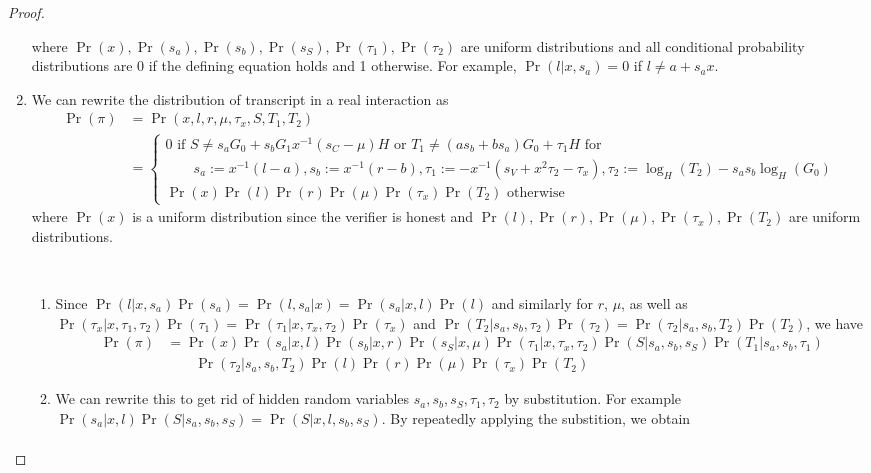 \begin{proof}
\begin{enumerate}
    where $\Pr(x),\Pr(s_a),\Pr(s_b),\Pr(s_S),\Pr(\tau_1),\Pr(\tau_2)$ are uniform distributions and all conditional probability distributions are 0 if the defining equation holds and 1 otherwise. For example, $\Pr(l|x, s_a) = 0$ if $l\ne a + s_ax$.
   \item We can rewrite the distribution of transcript in a real interaction as
    \begin{align*}
        \Pr(\pi) &= \Pr(x, l, r, \mu, \tau_x, S, T_1, T_2)\\
                        &= \begin{cases} 0 \text{ if } S \ne s_aG_0 + s_bG_1 x^{-1}(s_C - \mu)H \text{ or } T_1 \ne (as_b + bs_a)G_0 + \tau_1H \text{ for }\\ \qquad s_a := x^{-1}(l - a), s_b := x^{-1}(r - b), \tau_1 := - x^{-1}(s_V  + x^2\tau_2 - \tau_x), \tau_2 := \log_H(T_2) - s_as_b\log_H(G_0) \\
                             \Pr(x)\Pr(l)\Pr(r)\Pr(\mu)\Pr(\tau_x)\Pr(T_2) \text{ otherwise}
                             \end{cases}
    \end{align*}
    where $\Pr(x)$ is a uniform distribution since the verifier is honest and $\Pr(l),\Pr(r),\Pr(\mu),\Pr(\tau_x),\Pr(T_2)$ are uniform distributions.
   \begin{innerproof}
     $ $\par
     \begin{enumerate}
     \item Since $\Pr(l|x, s_a)\Pr(s_a) = \Pr(l,s_a|x) = \Pr(s_a|x, l) \Pr(l)$ and similarly for $r$, $\mu$, as well as $\Pr(\tau_x| x, \tau_1, \tau_2)\Pr(\tau_1 ) = \Pr(\tau_1| x, \tau_x, \tau_2)\Pr(\tau_x )$ and $\Pr(T_2| s_a, s_b, \tau_2)\Pr(\tau_2) = \Pr(\tau_2| s_a, s_b, T_2)\Pr(T_2)$,
       we have
       \begin{align*}
      \Pr(\pi) &= \Pr(x) \Pr(s_a|x, l) \Pr(s_b|x, r) \Pr(s_S| x, \mu) \Pr(\tau_1| x, \tau_x, \tau_2) \Pr(S| s_a, s_b, s_S) \Pr(T_1| s_a, s_b, \tau_1)\\
      &\qquad \Pr(\tau_2| s_a, s_b, T_2) \Pr(l)\Pr(r)\Pr(\mu)\Pr(\tau_x )\Pr(T_2)
       \end{align*}
     \item We can rewrite this to get rid of hidden random variables $s_a, s_b, s_S, \tau_1, \tau_2$ by substitution.
       For example $\Pr(s_a|x, l)\Pr(S| s_a, s_b, s_S) = \Pr(S| x, l, s_b, s_S)$.
       By repeatedly applying the substition, we obtain
       \begin{align*}

\end{align*}
\end{enumerate}
\end{innerproof}
\end{enumerate}
\end{proof}
